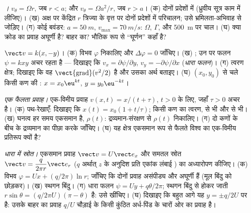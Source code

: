 \begin{exercise}[$\star\star$]\label{exo:b2:fluid-kinematics:8}
\emph{।} $v_\theta = \Omega r$, जब $r < a$; और
$v_\theta = \Omega a^2/r$, जब $r > a$। (क) दोनों प्रदेशों में  (ध्रुवीय सूत्र काम में लीजिए)। (ख)
अक्ष पर केंद्रित $r$ त्रिज्या के वृत्त पर दोनों प्रदेशों में
परिचालन; उसे भ्रमिलता-अभिवाह से जोड़िए। (ग) कोई बवंडर: $a = \qty{50}{m}$,
$v_{\max} = \qty{70}{m/s}$: $\Omega$, $\Gamma$, और \qty{500}{m} पर चाल।
(घ) क्या क्रोड का प्रवाह अघूर्णी है? बाहर का? भौतिक रूप से
``घूर्णन'' कहाँ है?
\end{exercise}

\begin{exercise}[$\star\star$]\label{exo:b2:fluid-kinematics:9}
\emph{} $\vect v = k(x, -y)$। (क) विभव $\varphi$ निकालिए और
$\Delta\varphi = 0$ जाँचिए। (ख) ; उन पर फलन $\psi = kxy$
अचर रहता है --- दिखाइए कि $v_x = \partial\psi/\partial y$, $v_y = -\partial\psi/
\partial x$ (\emph{धारा फलन})। (ग) त्वरण क्षेत्र; दिखाइए कि वह
$\operatorname{\vect{grad}}(v^2/2)$ है और उसका अर्थ बताइए। (घ) $(x_0, y_0)$ से
चले किसी कण की : $x = x_0\eu^{kt}$, $y = y_0\eu^{-kt}$।
\end{exercise}

\begin{exercise}[$\star\star\star$]\label{exo:b2:fluid-kinematics:10}
\emph{एक फैलता प्रवाह।} एक-विमीय प्रवाह $v(x, t) = x/(t + \tau)$,
$t > 0$ के लिए, जहाँ $\tau > 0$ अचर है। (क) पथ-रेखाएँ: दिखाइए कि $x(t) = x_0(1 +
t/\tau)$; किसी कण का त्वरण,  से भी और
 से भी। (ख) घनत्व हर समय एकसमान है,
$\rho(t)$: द्रव्यमान-संरक्षण से $\rho(t)$ निकालिए। (ग) दो कणों के बीच
के द्रव्यमान का पीछा करके जाँचिए। (घ) यह क्षेत्र एकसमान रूप से फैलते
विश्व का एक-विमीय प्रतिरूप क्यों है?
\end{exercise}

\begin{exercise}[$\star\star\star$]\label{exo:b2:fluid-kinematics:11}
\emph{धारा में स्रोत।} एकसमान प्रवाह $\vect v = U\vect e_x$
और समतल स्रोत $\vect v = \dfrac{q}{2\pi r}\vect e_r$ ($q$ अर्थात् $z$ के अनुदिश प्रति एकांक लंबाई ) का अध्यारोपण कीजिए। (क) विभव $\varphi = Ux +
(q/2\pi)\ln r$; जाँचिए कि दोनों प्रवाह असंपीड्य और अघूर्णी हैं
(मूल बिंदु को छोड़कर)। (ख) स्थगन बिंदु। (ग) धारा फलन $\psi
= Uy + q\theta/2\pi$; स्थगन बिंदु से होकर जाती 
$r\sin\theta = (q/2\pi U)(\pi - \theta)$ है: उसे खींचिए। (घ) दिखाइए कि बहुत
आगे यह  $y = \pm q/2U$ पर है: उसके बाहर का प्रवाह
$q/U$ चौड़ाई के किसी कुंठित अर्ध-पिंड के चारों ओर का प्रवाह है।
\end{exercise}

